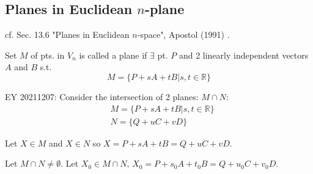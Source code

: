 \subsection{Planes in Euclidean $n$-plane}

cf. Sec. 13.6 "Planes in Euclidean $n$-space", Apostol (1991) \cite{dgdt:Apos1991}.

\begin{definition}
	Set $M$ of pts. in $V_n$ is called a plane if $\exists$ pt. $P$ and 2 linearly independent vectors $A$ and $B$ s.t.
	\begin{equation}
		M = \lbrace P + sA + tB | s, t \in \mathbb{R} \rbrace
	\end{equation}
\end{definition}

EY 20211207: Consider the intersection of 2 planes: $M \cap N$:
\[
\begin{aligned}
	& M = \lbrace P + sA + tB | s, t \in \mathbb{R} \rbrace \\
	& N = \lbrace Q + uC + vD \rbrace
\end{aligned}
\]

Let $X\in M$ and $X\in N$ so $X = P+sA + tB = Q+ uC + vD$. 

Let $M\cap N \neq \emptyset$. Let $X_0 \in M \cap N$, $X_0 = P + s_0 A + t_0 B = Q + u_0 C + v_0 D$.



